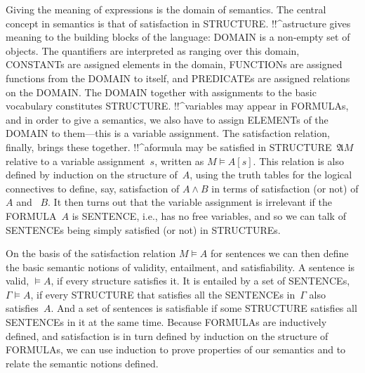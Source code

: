 \documentclass[10pt,a4paper]{article}
\newcommand*{\olup}[1]{\MakeUppercase{#1}}
\theoremstyle{plain}
\theoremstyle{definition}
\theoremstyle{remark}
\newcommand*{\olfileid}[3]{}
\providecommand{\Entails}{\mathrel{\models}}
\providecommand{\Struct}{\ensuremath{\mathfrak{A}}}
\providecommand{\Sat}[2]{\ensuremath{#1 \models #2}}
\begin{document}
Giving the meaning of expressions is the domain of semantics.  The
central concept in semantics is that of satisfaction in
\olup{structure}. !!^a{structure} gives meaning to the building blocks
of the language: \olup{domain} is a non-empty set of objects. The
quantifiers are interpreted as ranging over this domain, \olup{constant}s
are assigned elements in the domain, \olup{function}s are assigned
functions from the \olup{domain} to itself, and \olup{predicate}s are
assigned relations on the \olup{domain}.  The \olup{domain} together with
assignments to the basic vocabulary constitutes
\olup{structure}. !!^{variable}s may appear in \olup{formula}s, and in
order to give a semantics, we also have to assign \olup{element}s of the
\olup{domain} to them---this is a variable assignment. The satisfaction
relation, finally, brings these together. !!^a{formula} may be satisfied
in \olup{structure}~$\Struct{M}$ relative to a variable assignment~$s$,
written as $\Sat{M}{A}[s]$. This relation is also defined by
induction on the structure of~$A$, using the truth tables for the
logical connectives to define, say, satisfaction of $A \land B$ in
terms of satisfaction (or not) of $A$ and ~$B$.  It then turns out
that the variable assignment is irrelevant if the \olup{formula}~$A$ is
\olup{sentence}, i.e., has no free variables, and so we can talk of
\olup{sentence}s being simply satisfied (or not) in \olup{structure}s.

On the basis of the satisfaction relation $\Sat{M}{A}$ for sentences
we can then define the basic semantic notions of validity, entailment,
and satisfiability.  A sentence is valid, $\Entails A$, if every
structure satisfies it. It is entailed by a set of \olup{sentence}s,
$\Gamma \Entails A$, if every \olup{structure} that satisfies all the
\olup{sentence}s in~$\Gamma$ also satisfies~$A$. And a set of sentences
is satisfiable if some \olup{structure} satisfies all \olup{sentence}s in it
at the same time.  Because \olup{formula}s are inductively defined, and
satisfaction is in turn defined by induction on the structure of
\olup{formula}s, we can use induction to prove properties of our
semantics and to relate the semantic notions defined.








\olfileid{fol}{syn}{mai}
\end{document}
